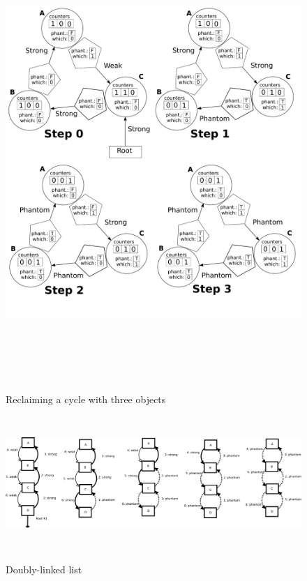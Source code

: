 \begin{figure}[!t]
  \centering
  {\includegraphics[height=6.5in]{figs/method}\label{fig:example1}}
  \caption{Reclaiming a cycle with three objects}%
  \label{ex1}
\end{figure}

\begin{figure}[!t]
  \centering
  {\includegraphics[height=2.0in]{figs/doublylinkedlist}\label{fig:example2}}
 \caption{Doubly-linked list}%
  \label{ex2}
\end{figure}

